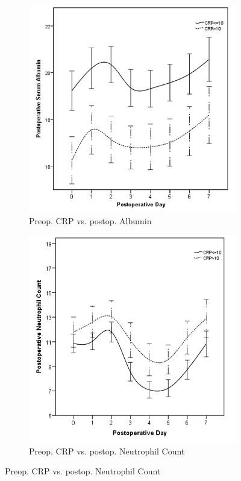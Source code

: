 \begin{figure}[p]
\begin{subfigure}{0.48\textwidth}
		\includegraphics[width=\textwidth]{Figures/sirs_crp_alb}
		\caption{Preop. CRP vs. postop. Albumin}
		\label{fig:sirs_crp_alb}
	\end{subfigure}
	
	\vspace{1cm}
	
	\begin{subfigure}{0.48\textwidth}
		\centering
		\includegraphics[width=\textwidth]{Figures/sirs_crp_neut}
		\caption{Preop. CRP vs. postop. Neutrophil Count}
		\label{fig:sirs_crp_neut}
	\end{subfigure}	
\end{figure}

